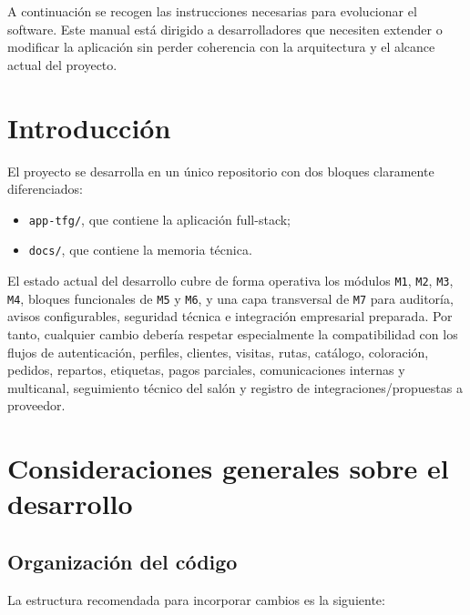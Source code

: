 A continuación se recogen las instrucciones necesarias para evolucionar el software. Este manual está dirigido a desarrolladores que necesiten extender o modificar la aplicación sin perder coherencia con la arquitectura y el alcance actual del proyecto.

\section{Introducción}

El proyecto se desarrolla en un único repositorio con dos bloques claramente diferenciados:

\begin{itemize}
    \item \texttt{app-tfg/}, que contiene la aplicación full-stack;
    \item \texttt{docs/}, que contiene la memoria técnica.
\end{itemize}

El estado actual del desarrollo cubre de forma operativa los módulos \texttt{M1}, \texttt{M2}, \texttt{M3}, \texttt{M4}, bloques funcionales de \texttt{M5} y \texttt{M6}, y una capa transversal de \texttt{M7} para auditoría, avisos configurables, seguridad técnica e integración empresarial preparada. Por tanto, cualquier cambio debería respetar especialmente la compatibilidad con los flujos de autenticación, perfiles, clientes, visitas, rutas, catálogo, coloración, pedidos, repartos, etiquetas, pagos parciales, comunicaciones internas y multicanal, seguimiento técnico del salón y registro de integraciones/propuestas a proveedor.



\section{Consideraciones generales sobre el desarrollo}

\subsection{Organización del código}

La estructura recomendada para incorporar cambios es la siguiente:

